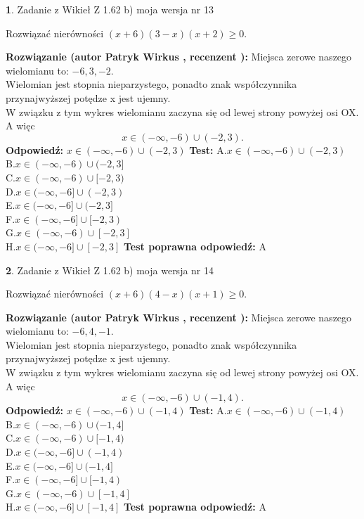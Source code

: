 \documentclass[12pt, a4paper]{article}
\theoremstyle{definition} %
\newtheorem{zad}{}
\newcommand{\zadStart}[1]{\begin{zad}#1\newline}
\newcommand{\zadStop}{\end{zad}}
\newcommand{\rozwStart}[2]{\noindent \textbf{Rozwiązanie (autor #1 , recenzent #2): }\newline}
\newcommand{\rozwStop}{\newline}
\newcommand{\odpStart}{\noindent \textbf{Odpowiedź:}\newline}
\newcommand{\odpStop}{\newline}
\newcommand{\testStart}{\noindent \textbf{Test:}\newline}
\newcommand{\testStop}{\newline}
\newcommand{\kluczStart}{\noindent \textbf{Test poprawna odpowiedź:}\newline}
\newcommand{\kluczStop}{\newline}
\begin{document}
\zadStart{Zadanie z Wikieł Z 1.62 b) moja wersja nr 13}

Rozwiązać nierówności $(x+6)(3-x)(x+2)\ge0$.
\zadStop
\rozwStart{Patryk Wirkus}{}
Miejsca zerowe naszego wielomianu to: $-6, 3, -2$.\\
Wielomian jest stopnia nieparzystego, ponadto znak współczynnika przy\linebreak najwyższej potędze x jest ujemny.\\ W związku z tym wykres wielomianu zaczyna się od lewej strony powyżej osi OX. A więc $$x \in (-\infty,-6) \cup (-2,3).$$
\rozwStop
\odpStart
$x \in (-\infty,-6) \cup (-2,3)$
\odpStop
\testStart
A.$x \in (-\infty,-6) \cup (-2,3)$\\
B.$x \in (-\infty,-6) \cup (-2,3]$\\
C.$x \in (-\infty,-6) \cup [-2,3)$\\
D.$x \in (-\infty,-6] \cup (-2,3)$\\
E.$x \in (-\infty,-6] \cup (-2,3]$\\
F.$x \in (-\infty,-6] \cup [-2,3)$\\
G.$x \in (-\infty,-6) \cup [-2,3]$\\
H.$x \in (-\infty,-6] \cup [-2,3]$
\testStop
\kluczStart
A
\kluczStop



\zadStart{Zadanie z Wikieł Z 1.62 b) moja wersja nr 14}

Rozwiązać nierówności $(x+6)(4-x)(x+1)\ge0$.
\zadStop
\rozwStart{Patryk Wirkus}{}
Miejsca zerowe naszego wielomianu to: $-6, 4, -1$.\\
Wielomian jest stopnia nieparzystego, ponadto znak współczynnika przy\linebreak najwyższej potędze x jest ujemny.\\ W związku z tym wykres wielomianu zaczyna się od lewej strony powyżej osi OX. A więc $$x \in (-\infty,-6) \cup (-1,4).$$
\rozwStop
\odpStart
$x \in (-\infty,-6) \cup (-1,4)$
\odpStop
\testStart
A.$x \in (-\infty,-6) \cup (-1,4)$\\
B.$x \in (-\infty,-6) \cup (-1,4]$\\
C.$x \in (-\infty,-6) \cup [-1,4)$\\
D.$x \in (-\infty,-6] \cup (-1,4)$\\
E.$x \in (-\infty,-6] \cup (-1,4]$\\
F.$x \in (-\infty,-6] \cup [-1,4)$\\
G.$x \in (-\infty,-6) \cup [-1,4]$\\
H.$x \in (-\infty,-6] \cup [-1,4]$
\testStop
\kluczStart
A
\kluczStop
\end{document}
